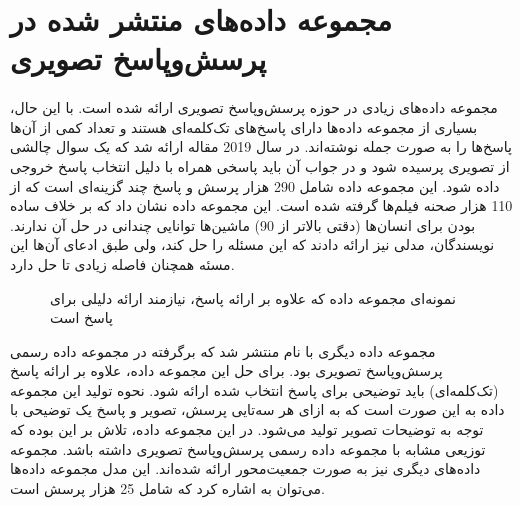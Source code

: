 \section{مجموعه داده‌های منتشر شده در پرسش‌وپاسخ تصویری}
\label{sec:vqa_datasets}
\paragraph{}
{
    مجموعه داده‌های زیادی در حوزه پرسش‌وپاسخ تصویری ارائه شده است. 
    با این حال، بسیاری از مجموعه داده‌ها دارای پاسخ‌های تک‌کلمه‌ای هستند 
    و تعداد کمی از آن‌ها پاسخ‌ها را به صورت جمله نوشته‌اند. 
    در سال 2019 مقاله 
     \cite{zellers2019recognition}
    ارائه شد که یک سوال چالشی از تصویری پرسیده شود و در جواب آن باید 
    پاسخی همراه با دلیل انتخاب پاسخ خروجی داده شود. 
    این مجموعه داده شامل 
    290 هزار 
    پرسش و پاسخ چند گزینه‌ای است که از 110 هزار صحنه فیلم‌ها گرفته شده است. 
    این مجموعه داده نشان داد که بر خلاف ساده بودن 
    برای انسان‌ها
    (دقتی بالاتر از 90)
    ماشین‌ها توانایی چندانی در حل آن ندارند. نویسندگان، مدلی نیز ارائه دادند که این
    مسئله را حل کند، ولی  طبق ادعای آن‌ها این مسئه همچنان فاصله زیادی تا حل دارد. 
    
    \begin{figure}[H]
        \caption{نمونه‌ای مجموعه داده 
        که علاوه بر ارائه پاسخ، نیازمند ارائه دلیلی برای پاسخ است}
        \label{fig:vcr}
    \end{figure}
    مجموعه داده‌ دیگری با نام 
     \cite{li2018vqa}
    منتشر شد که برگرفته در مجموعه داده رسمی پرسش‌وپاسخ تصویری بود. 
    برای حل این مجموعه داده، علاوه بر ارائه پاسخ 
    (تک‌کلمه‌ای)
    باید توضیحی برای پاسخ انتخاب شده ارائه شود. نحوه تولید این مجموعه داده
    به این صورت است که به ازای هر سه‌تایی پرسش، تصویر و پاسخ یک توضیحی 
    با توجه به توضیحات تصویر تولید می‌شود. در این مجموعه داده، تلاش بر این بوده
    که توزیعی مشابه با مجموعه داده رسمی پرسش‌وپاسخ تصویری داشته باشد. 
    مجموعه داده‌های دیگری نیز به صورت جمعیت‌‌محور ارائه شده‌اند. این مدل مجموعه
    داده‌ها می‌توان به 
     \cite{schwenk2022okvqa}
    اشاره کرد که شامل 25 هزار پرسش است. 
}

